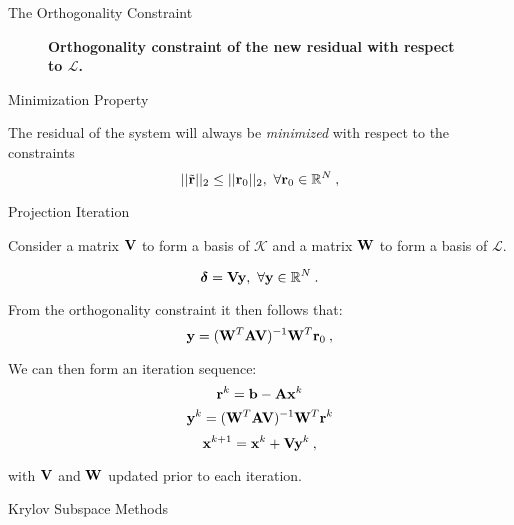 \documentclass{beamer}
\begin{document}
\begin{frame}{The Orthogonality Constraint}

  \begin{figure}[htpb!]
    \begin{center}
      \scalebox{1.25}{
         }
    \end{center}
    \caption{\textbf{Orthogonality constraint of the new residual with
        respect to $\mathcal{L}$.} }
  \end{figure}

  \pause
  \begin{beamerboxesrounded}[upper=boxheadcolor,lower=boxbodycolor,shadow=true]
    {Minimization Property}

    The residual of the system will always be \textit{minimized} with
    respect to the constraints
    \[
    ||\tilde{\ve{r}}||_2 \leq ||\ve{r}_0||_2,\ \forall \ve{r}_0 \in
    \mathbb{R}^N\:,
    \]
  \end{beamerboxesrounded}

\end{frame}

\begin{frame}{Projection Iteration}

  Consider a matrix $\mathbf{V}$ to form a basis of $\mathcal{K}$ and a
  matrix $\mathbf{W}$ to form a basis of $\mathcal{L}$.

  \[
  \boldsymbol{\delta} = \ve{V}\ve{y},\ \forall \ve{y} \in
  \mathbb{R}^N\:.
  \]

  From the orthogonality constraint it then follows that:
  \[
  \mathbf{y} = (\mathbf{W}^T\mathbf{A}\mathbf{V})^{-1}\mathbf{W}^T\mathbf{r}_0\:,
  \]

  We can then form an iteration sequence:
  \[
  \mathbf{r}^k = \mathbf{b} - \mathbf{A}\mathbf{x}^k
  \]
  \[
  \mathbf{y}^k = (\mathbf{W}^T\mathbf{A}\mathbf{V})^{-1}\mathbf{W}^T\mathbf{r}^k
  \]
  \[
  \mathbf{x}^{k+1} = \mathbf{x}^k + \mathbf{V}\mathbf{y}^k\:,
  \]

  with $\mathbf{V}$ and $\mathbf{W}$ updated prior to each iteration.

\end{frame}

\begin{frame}{Krylov Subspace Methods}

\end{frame}
\end{document}
